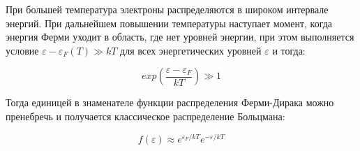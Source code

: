 \documentclass[__main__.tex]{subfiles}
\begin{document}
При большей температура электроны распределяются в широком интервале энергий. При дальнейшем повышении температуры наступает момент, когда энергия Ферми уходит в область, где нет уровней энергии, при этом выполняется условие $\varepsilon - \varepsilon_F(T) \gg kT$ для всех энергетических уровней $\varepsilon$ и тогда:

$$exp\left(\frac{\varepsilon - \varepsilon_F}{kT} \right) \gg 1$$

Тогда единицей в знаменателе функции распределения Ферми-Дирака можно пренебречь и получается классическое распределение Больцмана:

$$f(\varepsilon) \approx e^{\varepsilon_F/kT} e^{-\varepsilon/kT}$$
\end{document}
